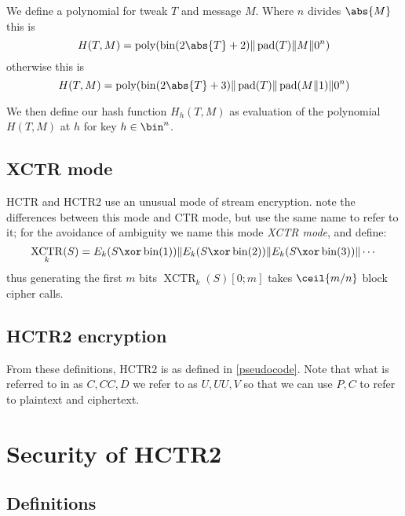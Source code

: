 \documentclass[letterpaper,11pt]{article}
\newcommand*{\Concat}{\Vert}
\newcommand*{\UU}{\mathit{UU}}
\DeclareMathOperator{\fromint}{bin}
\DeclareMathOperator{\pad}{pad}
\DeclareMathOperator{\poly}{poly}
\DeclareMathOperator{\XCTR}{XCTR}
\begin{document}
We define a polynomial for tweak \(T\) and message \(M\). Where \(n\) divides
\(\abs{M}\) this is
\begin{displaymath}
    H(T, M) = \poly(\fromint(2\abs{T} + 2) \Concat \pad(T) \Concat M \Concat 0^n)
\end{displaymath}
otherwise this is
\begin{displaymath}
    H(T, M) = \poly(\fromint(2\abs{T} + 3) \Concat \pad(T) \Concat \pad(M \Concat 1) \Concat 0^n)
\end{displaymath}

We then define our hash function \(H_h(T, M)\) as evaluation
of the polynomial \(H(T, M)\) at \(h\) for key \(h \in \bin^n\).

\subsection{XCTR mode}

HCTR and HCTR2 use an unusual mode of stream encryption.
\cite{hctr,hctrquad} note the differences between this mode and CTR mode,
but use the same name to refer to it; for the avoidance of ambiguity
we name this mode \emph{XCTR mode}, and define:
\begin{displaymath}
    \XCTR_k(S) = E_k(S \xor \fromint(1)) \Concat E_k(S \xor \fromint(2)) \Concat E_k(S \xor \fromint(3)) \Concat \cdots
\end{displaymath}
thus generating the first \(m\) bits \(\XCTR_k(S)[0; m]\) takes \(\ceil{m/n}\) block cipher calls.

\subsection{HCTR2 encryption}

From these definitions, HCTR2 is as defined in \autoref{pseudocode}.
Note that what is referred to in \cite{hctr,hctrquad} as \(C, \mathit{CC}, D\)
we refer to as \(U, \UU, V\)
so that we can use \(P, C\) to refer to plaintext and ciphertext.

\section{Security of HCTR2}
\subsection{Definitions}
\end{document}
